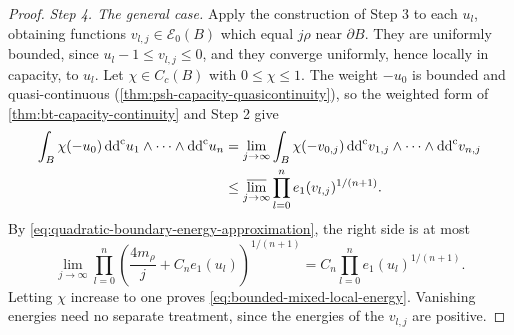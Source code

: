 \begin{proof}
\emph{Step 4. The general case.}
Apply the construction of Step 3 to each $u_l$, obtaining functions $v_{l,j}\in\mathcal E_0(B)$ which equal $j\rho$ near $\partial B$. They are uniformly bounded, since $u_l-1\leq v_{l,j}\leq0$, and they converge uniformly, hence locally in capacity, to $u_l$. Let $\chi\in C_c(B)$ with $0\leq\chi\leq1$. The weight $-u_0$ is bounded and quasi-continuous (\cref{thm:psh-capacity-quasicontinuity}), so the weighted form of \cref{thm:bt-capacity-continuity} and Step 2 give
\[
 \begin{aligned}
 \int_B\chi(-u_0)\,\mathrm{dd}^{\mathrm{c}} u_1\wedge\cdots\wedge\mathrm{dd}^{\mathrm{c}} u_n
 &=\lim_{j\to\infty}\int_B\chi(-v_{0,j})\,\mathrm{dd}^{\mathrm{c}} v_{1,j}\wedge\cdots\wedge\mathrm{dd}^{\mathrm{c}} v_{n,j}\\
 &\leq\varlimsup_{j\to\infty}\prod_{l=0}^ne_1(v_{l,j})^{1/(n+1)}.
 \end{aligned}
\]
By \eqref{eq:quadratic-boundary-energy-approximation}, the right side is at most
\[
 \lim_{j\to\infty}\prod_{l=0}^n\left(\frac{4m_\rho}j+C_ne_1(u_l)\right)^{1/(n+1)}
 =C_n\prod_{l=0}^ne_1(u_l)^{1/(n+1)}.
\]
Letting $\chi$ increase to one proves \eqref{eq:bounded-mixed-local-energy}. Vanishing energies need no separate treatment, since the energies of the $v_{l,j}$ are positive.
\end{proof}

